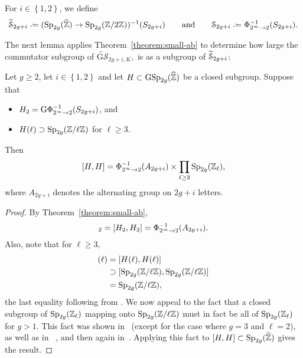 \begin{definition}\label{grpnotes}
	For $i \in \left\{ 1,2 \right\}$,
	we define 
	\begin{equation*}
 \hyphat_{2g+i} \defeq (\Sp_{2g}(\zh) \to \Sp_{2g}(\bz / 2 \bz))^{-1}(S_{2g+i}) \qquad \text{and} \qquad \hypaddict_{2g+i} \defeq \fy{2^\infty}{2}^{-1}(S_{2g+i}).
\end{equation*}
\end{definition}
The next lemma applies Theorem~\ref{theorem:small-ab} to determine how large the commutator subgroup of $\widetilde{\mathrm{G} \mathcal {S}}_{2g+i, K},$ is as a subgroup of $\widetilde{\mathcal{S}}_{2g+i}$:
\begin{lemma} \label{theorem:r=2}
	Let $g \ge 2$, let $i \in \left\{ 1,2 \right\}$
	and let $H \subset \operatorname{GSp}_{2g}(\widehat{\mathbb Z})$ be a closed subgroup. Suppose that 
\begin{itemize} 
\item $H_2 = \mathrm{G}\Phi_{2^\infty \to 2}^{-1}(S_{2g+i})$, and 
\item $H(\ell) \supset \operatorname{Sp}_{2g}({\mathbb Z} / \ell {\mathbb Z})$ for $\ell \ge 3$.
\end{itemize} 
Then 
\[
[H, H] = \Phi_{2^\infty \to 2}^{-1}(A_{2g+i}) \times \prod_{\ell \ge 3} \operatorname{Sp}_{2g}({\mathbb Z}_\ell),
\]
where $A_{2g+i}$ denotes the alternating group on $2g + i$ letters.
\end{lemma} 
\begin{proof} 
By Theorem~\ref{theorem:small-ab}, 
\begin{align*} 
[H, H]_2 = [H_2, H_2] = \fy{2^\infty}{2}^{-1}(A_{2g+i}). 
\end{align*} 
Also, note that for $\ell \ge 3$, 
\begin{align*}
[H, H](\ell) &= [H(\ell), H(\ell)] \\
&\supset [\Sp_{2g}(\bz / \ell \bz), \Sp_{2g} (\bz / \ell \bz)] \\
&= \Sp_{2g}(\bz / \ell \bz), 
\end{align*} 
the last equality following from \cite[3.3.6]{omeara1978symplectic}. 
We now appeal to the fact that a closed subgroup of $\operatorname{Sp}_{2g}(\mathbb{Z}_\ell)$ mapping onto $\operatorname{Sp}_{2g}(\mathbb{Z}/\ell\mathbb{Z})$ must in fact be all of $\operatorname{Sp}_{2g}(\mathbb{Z}_\ell)$ for $g > 1$.
This fact was shown in~\cite[Theorem B]{weigel:on-the-profinite-completion-of-arithmetic-groups-of-split-type} (except for the case where $g = 3$ and $\ell = 2$),
as well as in
~\cite[Theorem 1.3]{vasiu2003surjectivity},
and then again in~\cite[Proposition 2.5]{landesman-swaminathan-tao-xu:rational-families}.
Applying this fact to $[H, H] \subset \operatorname{Sp}_{2g}(\widehat{\mathbb Z})$ gives the result.
\end{proof} 
